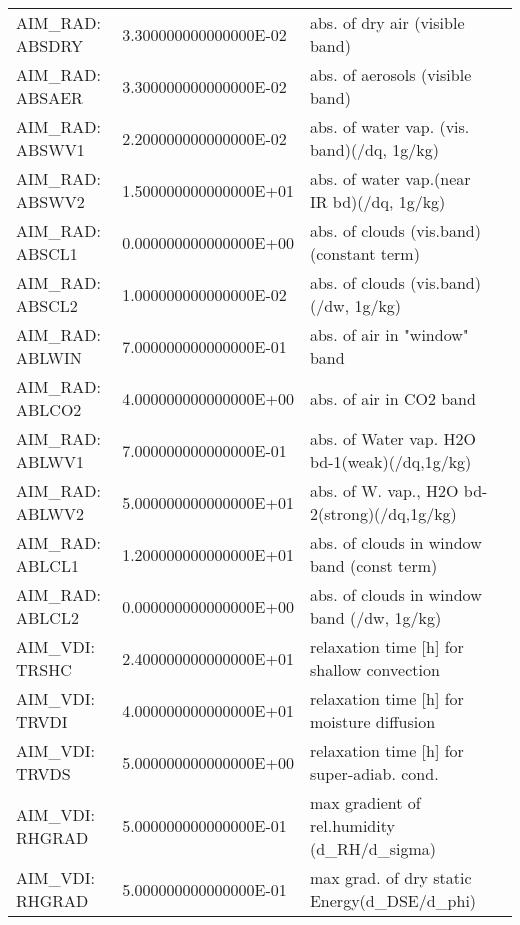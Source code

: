 \begin{table}
\begin{tabular}{lllc}
    \\
   AIM\_RAD: ABSDRY   &                   3.300000000000000E-02
    &   abs. of dry air (visible band) 
    &  %
    \\
   AIM\_RAD: ABSAER   &                   3.300000000000000E-02
    &   abs. of aerosols (visible band) 
    &  %
    \\
   AIM\_RAD: ABSWV1   &                   2.200000000000000E-02
    &   abs. of water vap. (vis. band)(/dq, 1g/kg) 
    &  %
    \\
   AIM\_RAD: ABSWV2   &                   1.500000000000000E+01
    &   abs. of water vap.(near IR bd)(/dq, 1g/kg) 
    &  %
    \\
   AIM\_RAD: ABSCL1   &                   0.000000000000000E+00
    &   abs. of clouds (vis.band)(constant term) 
    &  %
    \\
   AIM\_RAD: ABSCL2   &                   1.000000000000000E-02
    &   abs. of clouds (vis.band) (/dw, 1g/kg) 
    &  %
    \\
   AIM\_RAD: ABLWIN   &                   7.000000000000000E-01
    &   abs. of air in "window" band 
    &  %
    \\
   AIM\_RAD: ABLCO2   &                   4.000000000000000E+00
    &   abs. of air in CO2 band 
    &  %
    \\
   AIM\_RAD: ABLWV1   &                   7.000000000000000E-01
    &   abs. of Water vap. H2O bd-1(weak)(/dq,1g/kg)
    &  %
    \\
   AIM\_RAD: ABLWV2   &                   5.000000000000000E+01
    &   abs. of W. vap., H2O bd-2(strong)(/dq,1g/kg)
    &  %
    \\
   AIM\_RAD: ABLCL1   &                   1.200000000000000E+01
    &   abs. of clouds in window band (const term) 
    &  %
    \\
   AIM\_RAD: ABLCL2   &                   0.000000000000000E+00
    &   abs. of clouds in window band (/dw, 1g/kg) 
    &  %
    \\
   AIM\_VDI:  TRSHC   &                   2.400000000000000E+01
    &   relaxation time [h] for shallow convection 
    &  %
    \\
   AIM\_VDI:  TRVDI   &                   4.000000000000000E+01
    &   relaxation time [h] for moisture diffusion 
    &  %
    \\
   AIM\_VDI:  TRVDS   &                   5.000000000000000E+00
    &   relaxation time [h] for super-adiab. cond. 
    &  %
    \\
   AIM\_VDI: RHGRAD   &                   5.000000000000000E-01
    &   max gradient of rel.humidity (d\_RH/d\_sigma)
    &  %
    \\
   AIM\_VDI: RHGRAD   &                   5.000000000000000E-01
    &   max grad. of dry static Energy(d\_DSE/d\_phi)
    &  %
    \\

\end{tabular}
\end{table}
